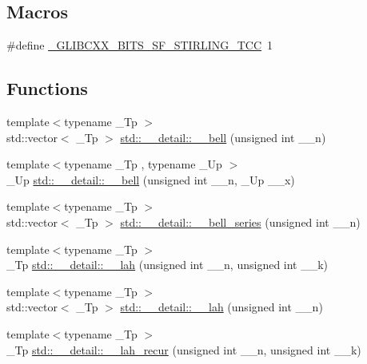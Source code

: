 \subsection*{Macros}
\begin{DoxyCompactItemize}
\item 
\#define \hyperlink{sf__stirling_8tcc_aa674f8ec509063cf88851a6ee6e72bc5}{\+\_\+\+G\+L\+I\+B\+C\+X\+X\+\_\+\+B\+I\+T\+S\+\_\+\+S\+F\+\_\+\+S\+T\+I\+R\+L\+I\+N\+G\+\_\+\+T\+CC}~1
\end{DoxyCompactItemize}
\subsection*{Functions}
\begin{DoxyCompactItemize}
\item 
{\footnotesize template$<$typename \+\_\+\+Tp $>$ }\\std\+::vector$<$ \+\_\+\+Tp $>$ \hyperlink{namespacestd_1_1____detail_ae2c2fdeec1af50db0d274cae70168dc9}{std\+::\+\_\+\+\_\+detail\+::\+\_\+\+\_\+bell} (unsigned int \+\_\+\+\_\+n)
\item 
{\footnotesize template$<$typename \+\_\+\+Tp , typename \+\_\+\+Up $>$ }\\\+\_\+\+Up \hyperlink{namespacestd_1_1____detail_a416c4b8a894dc8755484a8ad8740453a}{std\+::\+\_\+\+\_\+detail\+::\+\_\+\+\_\+bell} (unsigned int \+\_\+\+\_\+n, \+\_\+\+Up \+\_\+\+\_\+x)
\item 
{\footnotesize template$<$typename \+\_\+\+Tp $>$ }\\std\+::vector$<$ \+\_\+\+Tp $>$ \hyperlink{namespacestd_1_1____detail_acab68a50669a465d6bddc7a54a649819}{std\+::\+\_\+\+\_\+detail\+::\+\_\+\+\_\+bell\+\_\+series} (unsigned int \+\_\+\+\_\+n)
\item 
{\footnotesize template$<$typename \+\_\+\+Tp $>$ }\\\+\_\+\+Tp \hyperlink{namespacestd_1_1____detail_ac124597fd6b7d77f4474d62dda0b5715}{std\+::\+\_\+\+\_\+detail\+::\+\_\+\+\_\+lah} (unsigned int \+\_\+\+\_\+n, unsigned int \+\_\+\+\_\+k)
\item 
{\footnotesize template$<$typename \+\_\+\+Tp $>$ }\\std\+::vector$<$ \+\_\+\+Tp $>$ \hyperlink{namespacestd_1_1____detail_af6d01a95dbd0418929960fa127e01b99}{std\+::\+\_\+\+\_\+detail\+::\+\_\+\+\_\+lah} (unsigned int \+\_\+\+\_\+n)
\item 
{\footnotesize template$<$typename \+\_\+\+Tp $>$ }\\\+\_\+\+Tp \hyperlink{namespacestd_1_1____detail_ac3e6ae56f6e6e31636f0bc46a11d9b8e}{std\+::\+\_\+\+\_\+detail\+::\+\_\+\+\_\+lah\+\_\+recur} (unsigned int \+\_\+\+\_\+n, unsigned int \+\_\+\+\_\+k)

\end{DoxyCompactItemize}
